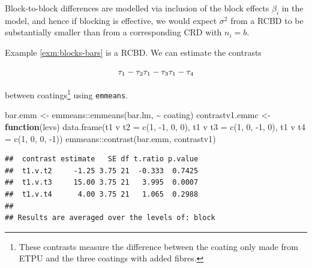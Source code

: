 \documentclass[
]{book}
\newenvironment{Shaded}{\begin{snugshade}}{\end{snugshade}}
\newcommand{\ControlFlowTok}[1]{\textcolor[rgb]{0.13,0.29,0.53}{\textbf{#1}}}
\newcommand{\DecValTok}[1]{\textcolor[rgb]{0.00,0.00,0.81}{#1}}
\newcommand{\FunctionTok}[1]{\textcolor[rgb]{0.00,0.00,0.00}{#1}}
\newcommand{\NormalTok}[1]{#1}
\newcommand{\OtherTok}[1]{\textcolor[rgb]{0.56,0.35,0.01}{#1}}
\newcommand{\SpecialCharTok}[1]{\textcolor[rgb]{0.00,0.00,0.00}{#1}}
\newcommand{\StringTok}[1]{\textcolor[rgb]{0.31,0.60,0.02}{#1}}
\theoremstyle{definition}
\theoremstyle{definition}
\theoremstyle{definition}
\theoremstyle{definition}
\theoremstyle{remark}
\begin{document}
Block-to-block differences are modelled via inclusion of the block effects \(\beta_i\) in the model, and hence if blocking is effective, we would expect \(\sigma^2\) from a RCBD to be substantially smaller than from a corresponding CRD with \(n_i = b\).

Example \ref{exm:blocks-bars} is a RCBD. We can estimate the contrasts

\[
\tau_{1} - \tau_{2} \\
\tau_{1} - \tau_{3} \\
\tau_{1} - \tau_{4} \\
\]

between coatings\footnote{These contrasts measure the difference between the coating only made from ETPU and the three coatings with added fibres.} using \texttt{emmeans}.

\begin{Shaded}
\begin{Highlighting}[]
\NormalTok{bar.emm }\OtherTok{\textless{}{-}}\NormalTok{ emmeans}\SpecialCharTok{::}\FunctionTok{emmeans}\NormalTok{(bar.lm, }\SpecialCharTok{\textasciitilde{}}\NormalTok{ coating)}
\NormalTok{contrastv1.emmc }\OtherTok{\textless{}{-}} \ControlFlowTok{function}\NormalTok{(levs)}
  \FunctionTok{data.frame}\NormalTok{(}\StringTok{\textquotesingle{}t1 v t2\textquotesingle{}} \OtherTok{=} \FunctionTok{c}\NormalTok{(}\DecValTok{1}\NormalTok{, }\SpecialCharTok{{-}}\DecValTok{1}\NormalTok{, }\DecValTok{0}\NormalTok{, }\DecValTok{0}\NormalTok{), }\StringTok{\textquotesingle{}t1 v t3\textquotesingle{}} \OtherTok{=} \FunctionTok{c}\NormalTok{(}\DecValTok{1}\NormalTok{, }\DecValTok{0}\NormalTok{, }\SpecialCharTok{{-}}\DecValTok{1}\NormalTok{, }\DecValTok{0}\NormalTok{), }
  \StringTok{\textquotesingle{}t1 v t4\textquotesingle{}} \OtherTok{=} \FunctionTok{c}\NormalTok{(}\DecValTok{1}\NormalTok{, }\DecValTok{0}\NormalTok{, }\DecValTok{0}\NormalTok{, }\SpecialCharTok{{-}}\DecValTok{1}\NormalTok{))}
\NormalTok{emmeans}\SpecialCharTok{::}\FunctionTok{contrast}\NormalTok{(bar.emm, }\StringTok{\textquotesingle{}contrastv1\textquotesingle{}}\NormalTok{)}
\end{Highlighting}
\end{Shaded}

\begin{verbatim}
##  contrast estimate   SE df t.ratio p.value
##  t1.v.t2     -1.25 3.75 21  -0.333  0.7425
##  t1.v.t3     15.00 3.75 21   3.995  0.0007
##  t1.v.t4      4.00 3.75 21   1.065  0.2988
## 
## Results are averaged over the levels of: block
\end{verbatim}
\end{document}
